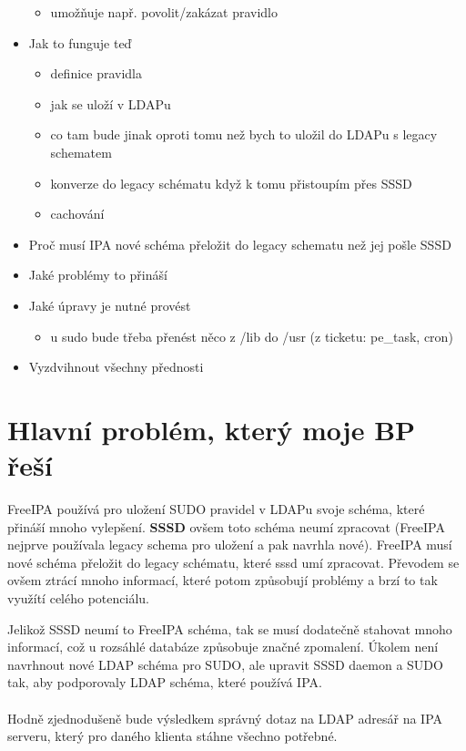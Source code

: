 \documentclass[10pt,a4paper,notitlepage]{article}
\begin{document}
\begin{itemize}
	\begin{itemize}
		\item umožňuje např. povolit/zakázat pravidlo
	\end{itemize}
		
	\item Jak to funguje teď

	\begin{itemize}
		\item definice pravidla
		\item jak se uloží v LDAPu
		\item co tam bude jinak oproti tomu než bych to uložil do LDAPu s legacy
			schematem
		\item konverze do legacy schématu když k tomu přistoupím přes SSSD
		\item cachování
	\end{itemize}
	\item Proč musí IPA nové schéma přeložit do legacy schematu než jej pošle
		SSSD
	\item Jaké problémy to přináší
	\item Jaké úpravy je nutné provést
	\begin{itemize}
		\item u sudo bude třeba přenést něco z /lib do /usr (z ticketu: pe\_task,
			cron)
	\end{itemize}
	\item Vyzdvihnout všechny přednosti
\end{itemize}

\section*{Hlavní problém, který moje BP řeší}
FreeIPA používá pro uložení SUDO pravidel v LDAPu svoje schéma, které přináší
mnoho vylepšení. \textbf{SSSD} ovšem toto schéma neumí zpracovat (FreeIPA
nejprve používala legacy schema pro uložení a pak navrhla nové). FreeIPA musí
nové schéma přeložit do legacy schématu, které sssd umí zpracovat. Převodem se
ovšem ztrácí mnoho informací, které potom způsobují problémy a brzí to tak
využítí celého potenciálu.

Jelikož SSSD neumí to FreeIPA schéma, tak se musí dodatečně stahovat mnoho
informací, což u rozsáhlé databáze způsobuje značné zpomalení. Úkolem není
navrhnout nové LDAP schéma pro SUDO, ale upravit SSSD daemon a SUDO tak, aby
podporovaly LDAP schéma, které používá IPA.
\\
\\
Hodně zjednodušeně bude výsledkem správný dotaz na LDAP adresář na IPA serveru,
který pro daného klienta stáhne všechno potřebné.
\end{document}
